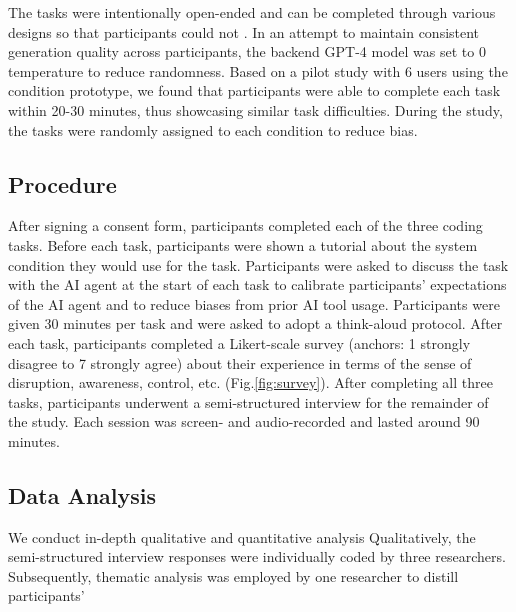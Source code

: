 The tasks were intentionally open-ended and can be completed through various designs so that participants could not . 
In an attempt to maintain consistent generation quality across participants, the backend GPT-4 model was set to 0 temperature to reduce randomness. 
Based on a pilot study with 6 users using the \sys{} condition prototype, we found that participants were able to complete each task within 20-30 minutes, thus showcasing similar task difficulties. 
During the study, the tasks were randomly assigned to each condition to reduce bias.


\subsection{Procedure}
After signing a consent form, participants completed each of the three coding tasks. Before each task, participants were shown a tutorial about the system condition they would use for the task. Participants were asked to discuss the task with the AI agent at the start of each task to calibrate participants' expectations of the AI agent and to reduce biases from prior AI tool usage. Participants were given 30 minutes per task and were asked to adopt a think-aloud protocol. 
After each task, participants completed a Likert-scale survey (anchors: 1 strongly disagree to 7 strongly agree) about their experience in terms of the sense of disruption, awareness, control, etc. (Fig.\ref{fig:survey}). After completing all three tasks, participants underwent a semi-structured interview for the remainder of the study. Each session was screen- and audio-recorded and lasted around 90 minutes.

\subsection{Data Analysis}
We conduct in-depth qualitative and quantitative analysis 
Qualitatively, the semi-structured interview responses were individually coded by three researchers. 
Subsequently, thematic analysis \cite{braun2006using, vaismoradi2013content} was employed by one researcher to distill participants' 

